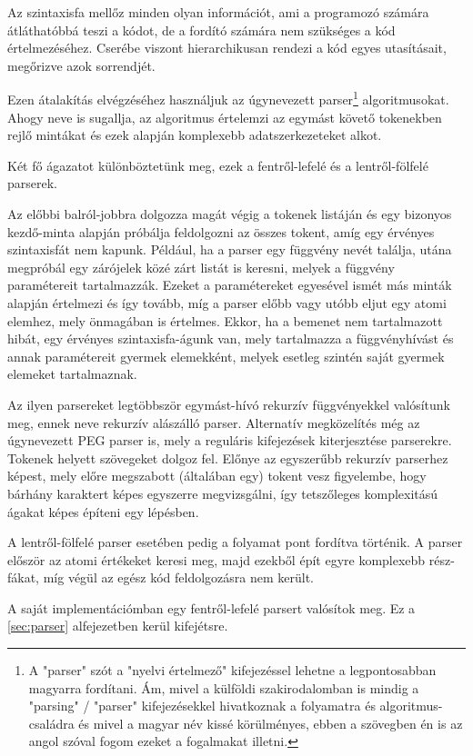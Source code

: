 Az szintaxisfa mellőz minden olyan információt, ami a programozó számára átláthatóbbá teszi a kódot, de a fordító számára nem szükséges a kód értelmezéséhez. Cserébe viszont hierarchikusan rendezi a kód egyes utasításait, megőrizve azok sorrendjét.

Ezen átalakítás elvégzéséhez használjuk az úgynevezett parser\footnote{A "parser" szót a "nyelvi értelmező" kifejezéssel lehetne a legpontosabban magyarra fordítani. Ám, mivel a külföldi szakirodalomban is mindig a "parsing" / "parser" kifejezésekkel hivatkoznak a folyamatra és algoritmus-családra és mivel a magyar név kissé körülményes, ebben a szövegben én is az angol szóval fogom ezeket a fogalmakat illetni.} algoritmusokat. Ahogy neve is sugallja, az algoritmus értelemzi az egymást követő tokenekben rejlő mintákat és ezek alapján komplexebb adatszerkezeteket alkot.

Két fő ágazatot különböztetünk meg, ezek a fentről-lefelé és a lentről-fölfelé parserek.

Az előbbi balról-jobbra dolgozza magát végig a tokenek listáján és egy bizonyos kezdő-minta alapján próbálja feldolgozni az összes tokent, amíg egy érvényes szintaxisfát nem kapunk. Például, ha a parser egy függvény nevét találja, utána megpróbál egy zárójelek közé zárt listát is keresni, melyek a függvény paramétereit tartalmazzák. Ezeket a paramétereket egyesével ismét más minták alapján értelmezi és így tovább, míg a parser előbb vagy utóbb eljut egy atomi elemhez, mely önmagában is értelmes. Ekkor, ha a bemenet nem tartalmazott hibát, egy érvényes szintaxisfa-águnk van, mely tartalmazza a függvényhívást és annak paramétereit gyermek elemekként, melyek esetleg szintén saját gyermek elemeket tartalmaznak. 

Az ilyen parsereket legtöbbször egymást-hívó rekurzív függvényekkel valósítunk meg, ennek neve rekurzív alászálló parser. Alternatív megközelítés még az úgynevezett PEG parser is, mely a reguláris kifejezések kiterjesztése parserekre. Tokenek helyett szövegeket dolgoz fel. Előnye az egyszerűbb rekurzív parserhez képest, mely előre megszabott (általában egy) tokent vesz figyelembe, hogy bárhány karaktert képes egyszerre megvizsgálni, így tetszőleges komplexitású ágakat képes építeni egy lépésben.

A lentről-fölfelé parser esetében pedig a folyamat pont fordítva történik. A parser először az atomi értékeket keresi meg, majd ezekből épít egyre komplexebb rész-fákat, míg végül az egész kód feldolgozásra nem került.

A saját implementációmban egy fentről-lefelé parsert valósítok meg. Ez a \ref{sec:parser} alfejezetben kerül kifejétsre.

